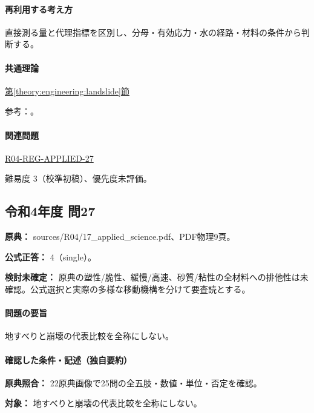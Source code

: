 \paragraph{再利用する考え方} 直接測る量と代理指標を区別し、分母・有効応力・水の経路・材料の条件から判断する。

\paragraph{共通理論} \hyperref[theory:engineering:landslide]{第\ref*{theory:engineering:landslide}節}

\par 参考：\cite{eng52_landslide_ref}。

\paragraph{関連問題} \hyperref[q:r04-reg-applied-27]{R04-REG-APPLIED-27}

\par 難易度 3（校準初稿）、優先度未評価。

\subsection{令和4年度 問27}
\label{q:r04-reg-applied-27}

\noindent\textbf{原典：} sources/R04/17\_applied\_science.pdf、PDF物理9頁。

\textbf{公式正答：} 4（single）。

\par\textbf{検討未確定：} 原典の塑性/脆性、緩慢/高速、砂質/粘性の全材料への排他性は未確認。公式選択と実際の多様な移動機構を分けて要査読とする。

\paragraph{問題の要旨} 地すべりと崩壊の代表比較を全称にしない。

\paragraph{確認した条件・記述（独自要約）}\mbox{}\par

\noindent\textbf{原典照合：} 22原典画像で25問の全五肢・数値・単位・否定を確認。\par

\noindent\textbf{対象：} 地すべりと崩壊の代表比較を全称にしない。\par

